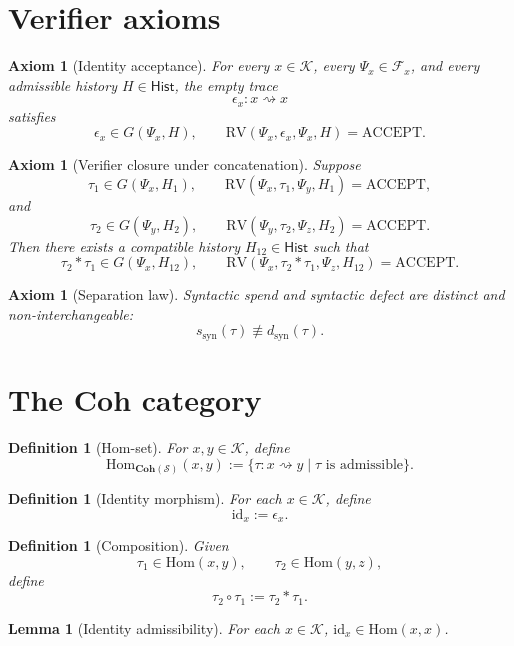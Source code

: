 \documentclass[11pt]{article}
\newtheorem{definition}[theorem]{Definition}
\newtheorem{lemma}[theorem]{Lemma}
\newtheorem{axiom}[theorem]{Axiom}
\newcommand{\Coh}{\mathbf{Coh}}
\newcommand{\Hom}{\mathrm{Hom}}
\newcommand{\id}{\mathrm{id}}
\newcommand{\ACCEPT}{\mathrm{ACCEPT}}
\newcommand{\RV}{\mathrm{RV}}
\newcommand{\syn}{\mathrm{syn}}
\newcommand{\Kadm}{\mathcal{K}}
\newcommand{\F}{\mathcal{F}}
\newcommand{\Hist}{\mathsf{Hist}}
\begin{document}
\section{Verifier axioms}

\begin{axiom}[Identity acceptance]
For every $x\in\Kadm$, every $\Psi_x\in\F_x$, and every admissible history $H\in\Hist$, the empty trace
\[
\epsilon_x:x\rightsquigarrow x
\]
satisfies
\[
\epsilon_x\in G(\Psi_x,H),
\qquad
\RV(\Psi_x,\epsilon_x,\Psi_x,H)=\ACCEPT.
\]
\end{axiom}

\begin{axiom}[Verifier closure under concatenation]
Suppose
\[
\tau_1\in G(\Psi_x,H_1),\qquad \RV(\Psi_x,\tau_1,\Psi_y,H_1)=\ACCEPT,
\]
and
\[
\tau_2\in G(\Psi_y,H_2),\qquad \RV(\Psi_y,\tau_2,\Psi_z,H_2)=\ACCEPT.
\]
Then there exists a compatible history $H_{12}\in\Hist$ such that
\[
\tau_2 * \tau_1 \in G(\Psi_x,H_{12}),
\qquad
\RV(\Psi_x,\tau_2 * \tau_1,\Psi_z,H_{12})=\ACCEPT.
\]
\end{axiom}

\begin{axiom}[Separation law]
Syntactic spend and syntactic defect are distinct and non-interchangeable:
\[
s_{\syn}(\tau)\not\equiv d_{\syn}(\tau).
\]
\end{axiom}

\section{The Coh category}

\begin{definition}[Hom-set]
For $x,y\in\Kadm$, define
\[
\Hom_{\Coh(\mathcal S)}(x,y)
:=
\{\tau:x\rightsquigarrow y \mid \tau \text{ is admissible}\}.
\]
\end{definition}

\begin{definition}[Identity morphism]
For each $x\in\Kadm$, define
\[
\id_x:=\epsilon_x.
\]
\end{definition}

\begin{definition}[Composition]
Given
\[
\tau_1\in\Hom(x,y),\qquad \tau_2\in\Hom(y,z),
\]
define
\[
\tau_2\circ \tau_1:=\tau_2 * \tau_1.
\]
\end{definition}

\begin{lemma}[Identity admissibility]\label{lem:id-adm}
For each $x\in\Kadm$, $\id_x\in \Hom(x,x)$.
\end{lemma}
\end{document}
